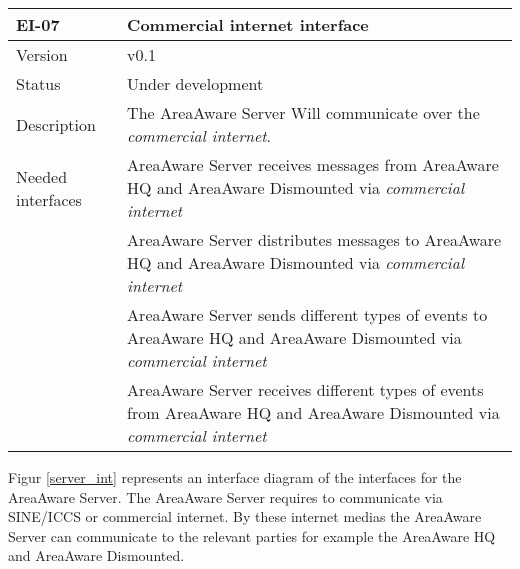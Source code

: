 \begin{longtable}{| p{3.5cm} |  p{10cm} | }
	\hline
	\textbf{EI-07} &  \textbf{Commercial internet interface} \\
	\hline
	Version & v0.1 \\
	\hline
	Status & Under development \\
	\hline
	Description & The AreaAware Server Will communicate over the \emph{commercial internet}.
	\\
	\hline
	Needed interfaces 
	& AreaAware Server receives messages from AreaAware HQ and AreaAware Dismounted via \emph{commercial internet} \\
	& AreaAware Server distributes messages to AreaAware HQ and AreaAware Dismounted via \emph{commercial internet} \\ 
	& AreaAware Server sends different types of events to AreaAware HQ and AreaAware Dismounted via \emph{commercial internet} \\
	& AreaAware Server receives different types of events from AreaAware HQ and AreaAware Dismounted via \emph{commercial internet} \\
	\hline
\end{longtable}


Figur \ref{server_int} represents an interface diagram of the interfaces for the AreaAware Server. The AreaAware Server requires to communicate via SINE/ICCS or commercial internet. By these internet medias the AreaAware Server can communicate to the relevant parties for example the AreaAware HQ and AreaAware Dismounted.
